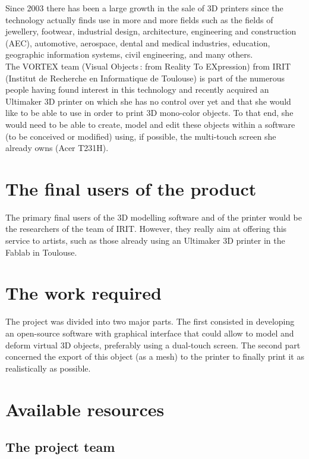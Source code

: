 \documentclass{report}
\begin{document}
	Since 2003 there has been a large growth in the sale of 3D printers since the technology actually finds use in more and more fields such as the fields of jewellery, footwear, industrial design, architecture, engineering and construction (AEC), automotive, aerospace, dental and medical industries, education, geographic information systems, civil engineering, and many others.\\

	The VORTEX team (Visual Objects : from Reality To EXpression) from IRIT (Institut de Recherche en Informatique de Toulouse) is part of the numerous people having found interest in this technology and recently acquired an Ultimaker 3D printer on which she has no control over yet and that she would like to be able to use in order to print 3D mono-color objects. To that end, she would need to be able to create, model and edit these objects within a software (to be conceived or modified) using, if possible, the multi-touch screen she already owns (Acer T231H).\\

\section{The final users of the product}

	The primary final users of the 3D modelling software and of the printer would be the researchers of the team of IRIT. However, they really aim at offering this service to artists, such as those already using an Ultimaker 3D printer in the Fablab in Toulouse.

\section{The work required}

	The project was divided into two major parts. The first consisted in developing an open-source software with graphical interface that could allow to model and deform virtual 3D objects, preferably using a dual-touch screen. The second part concerned the export of this object (as a mesh) to the printer to finally print it as realistically as possible.

\section{Available resources}

\subsection{The project team}
\end{document}
